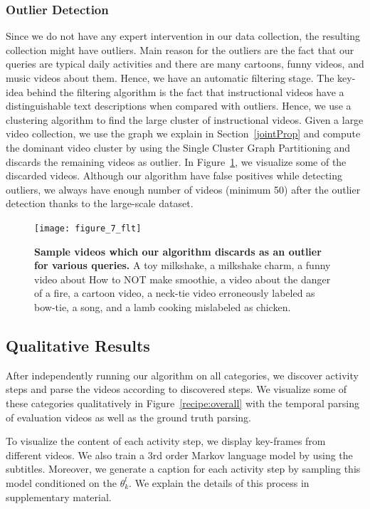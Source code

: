 \subsubsection{Outlier Detection}
\label{filter}
Since we do not have any expert intervention in our data collection, the resulting collection might have outliers. Main reason for the outliers are  the fact that our queries are typical daily activities and there are many cartoons, funny videos, and music videos about them. Hence, we have an automatic filtering stage. The key-idea behind the filtering algorithm is the fact that instructional videos have a distinguishable text descriptions when compared with outliers. Hence, we use a clustering algorithm to find the large cluster of instructional videos. Given a large video collection, we use the graph we explain in Section~\ref{jointProp} and compute the dominant video cluster by using the Single Cluster Graph Partitioning \cite{scgp} and discards the remaining videos as outlier. In Figure~\ref{outliers}, we visualize some of the discarded videos. Although our algorithm have false positives while detecting outliers, we always have enough number of videos (minimum 50) after the outlier detection thanks to the large-scale dataset.

\begin{figure}[ht]
    \texttt{[image: figure\_7\_flt]}
\caption{\textbf{Sample videos which our algorithm discards as an outlier for various queries.}
A toy milkshake, a milkshake charm, a funny video about How to NOT make smoothie, a video about the danger of a fire, a cartoon video, a neck-tie video erroneously labeled as bow-tie, a song, and a lamb cooking mislabeled as chicken.}
\label{outliers}
\vspace{-3mm}
\end{figure}

\subsection{Qualitative Results}
After independently running our algorithm on all categories, we discover activity steps and parse the videos according to discovered steps. We visualize some of these categories qualitatively in Figure~\ref{recipe:overall} with the temporal parsing of evaluation videos as well as the ground truth parsing.

To visualize the content of each activity step, we display key-frames from different videos. We also train a 3rd order Markov language model\cite{languageModel} by using the subtitles. Moreover, we generate a caption for each activity step by sampling this model conditioned on the $\theta^l_k$. We explain the details of this process in supplementary material.

